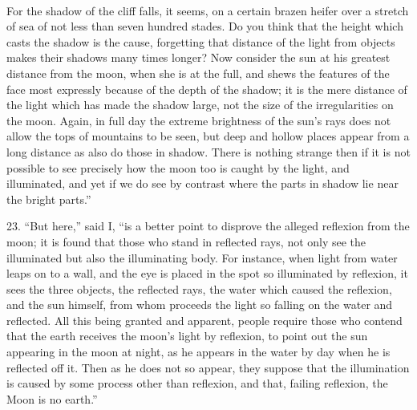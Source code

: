 \documentclass[a4paper, 11pt, oneside, polutonikogreek, english]{article}
\begin{document}
\paragraph{}
For the shadow of the cliff falls, it seems, on a certain brazen heifer over a stretch of sea of not less than seven hundred stades. Do you think that the height which casts the shadow is the cause, forgetting that distance of the light from objects makes their shadows many times longer? Now consider the sun at his greatest distance from the moon, when she is at the full, and shews the features of the face most expressly because of the depth of the shadow; it is the mere distance of the light which has made the shadow large, not the size of the irregularities on the moon. Again, in full day the extreme brightness of the sun's rays does not allow the tops of mountains to be seen, but deep and hollow places appear from a long distance as also do those in shadow. There is nothing strange then if it is not possible to see precisely how the moon too is caught by the light, and illuminated, and yet if we do see by contrast where the parts in shadow lie near the bright parts.''

23. ``But here,'' said I, ``is a better point to disprove the alleged reflexion from the moon; it is found that those who stand in reflected rays, not only see the illuminated but also the illuminating body. For instance, when light from water leaps on to a wall, and the eye is placed in the spot so illuminated by reflexion, it sees the three objects, the reflected rays, the water which caused the reflexion, and the sun himself, from whom proceeds the light so falling on the water and reflected. All this being granted and apparent, people require those who contend that the earth receives the moon's light by reflexion, to point out the sun appearing in the moon at night, as he appears in the water by day when he is reflected off it. Then as he does not so appear, they suppose that the illumination is caused by some process other than reflexion, and that, failing reflexion, the Moon is no earth.''
\end{document}
